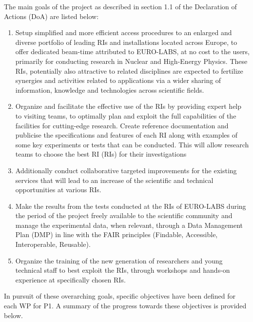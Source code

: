 The main goals of the project as described in section 1.1 of the Declaration of Actions (DoA) are listed below: 
\begin{tcolorbox}[myliststyle]
\begin{enumerate}[label=\textbf{\arabic*.}, nosep, left=0pt]
    \item Setup simplified and more efficient access procedures to an enlarged and diverse portfolio of leading RIs and installations located across Europe, to offer dedicated beam-time attributed to EURO-LABS, at no cost to the users, primarily for conducting research in Nuclear and High-Energy Physics. These RIs, potentially also attractive to related disciplines are expected to fertilize synergies and activities related to applications via a wider sharing of information, knowledge and technologies across scientific fields.
    \item Organize and facilitate the effective use of the RIs by providing expert help to visiting teams, to optimally plan and exploit the full capabilities of the facilities for cutting-edge research. Create reference documentation and publicise the specifications and features of each RI along with examples of some key experiments or tests that can be conducted. This will allow research teams to choose the best RI (RIs) for their investigations
    \item Additionally conduct collaborative targeted improvements for the existing services that will lead to an increase of the scientific and technical opportunities at various RIs.
    \item Make the results from the tests conducted at the RIs of EURO-LABS during the period of the project freely available to the scientific community and manage the experimental data, when relevant, through a Data Management Plan (DMP) in line with the FAIR principles (Findable, Accessible, Interoperable, Reusable).
    \item Organize the training of the new generation of researchers and young technical staff to best exploit the RIs, through workshops and hands-on experience at specifically chosen RIs.
\end{enumerate}
\end{tcolorbox}

In pursuit of these overarching goals, specific objectives have been defined for each WP for P1. A summary of the progress towards these objectives is provided below.


